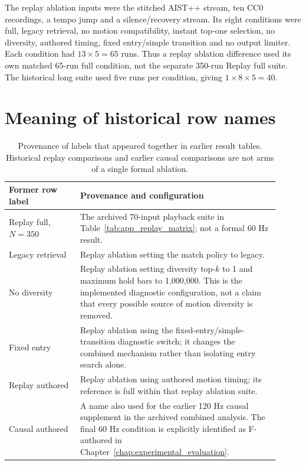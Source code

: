 The replay ablation inputs were the stitched AIST++ stream, ten CC0 recordings,
a tempo jump and a silence/recovery stream. Its eight conditions were full,
legacy retrieval, no motion compatibility, instant top-one selection,
no diversity, authored timing, fixed entry/simple transition and no output
limiter. Each condition had $13\times5=65$ runs. Thus a replay ablation
difference used its own matched 65-run full condition, not the separate
350-run Replay full suite. The historical long suite used five runs per
condition, giving $1\times8\times5=40$.

\section{Meaning of historical row names}

\begin{table}[htbp]
\centering\small
\begin{tabular}{p{0.24\linewidth}p{0.67\linewidth}}
\toprule
Former row label & Provenance and configuration \\
\midrule
Replay full, $N=350$ & The archived 70-input playback suite in
Table~\ref{tab:app_replay_matrix}; not a formal 60 Hz result. \\
Legacy retrieval & Replay ablation setting the match policy to legacy. \\
No diversity & Replay ablation setting diversity top-$k$ to 1 and
maximum hold bars to 1,000,000. This is the implemented diagnostic configuration,
not a claim that every possible source of motion diversity is removed. \\
Fixed entry & Replay ablation using the fixed-entry/simple-transition
diagnostic switch; it changes the combined mechanism rather than isolating
entry search alone. \\
Replay authored & Replay ablation using authored motion timing;
its reference is full within that replay ablation suite. \\
Causal authored & A name also used for the earlier 120 Hz causal supplement
in the archived combined analysis. The final 60 Hz condition is explicitly
identified as F-authored in Chapter~\ref{chap:experimental_evaluation}. \\
\bottomrule
\end{tabular}
\caption{Provenance of labels that appeared together in earlier result tables.
Historical replay comparisons and earlier causal comparisons are not arms
of a single formal ablation.}
\label{tab:app_historical_labels}
\end{table}

